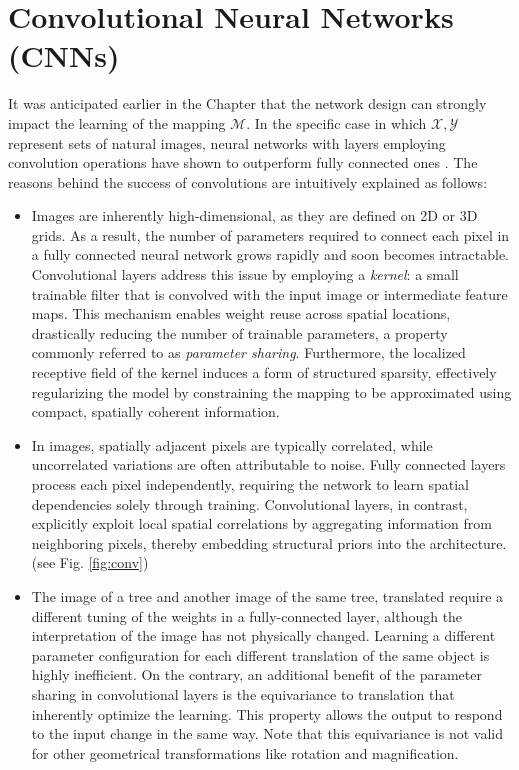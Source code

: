 \section{Convolutional Neural Networks (CNNs)}

It was anticipated earlier in the Chapter that the network design can strongly impact the learning of the mapping 
$\mathcal{M}$. In the specific case in which $\mathcal{X}, \mathcal{Y}$ represent sets of natural images, neural 
networks with layers employing convolution operations have shown to outperform fully connected ones \cite{Fukushima1982,LeCun1989Handwritten, LeCun1989Backpropagation}. 
The reasons behind the success of convolutions are intuitively explained as follows: 

\begin{itemize}

    \item Images are inherently high-dimensional, as they are defined on 2D or 3D grids. As a result, the number of 
    parameters required to connect each pixel in a fully connected neural network grows rapidly and soon becomes 
    intractable. Convolutional layers address this issue by employing a \textit{kernel}: a small trainable filter 
    that is convolved with the input image or intermediate feature maps. This mechanism enables weight reuse across spatial 
    locations, drastically reducing the number of trainable parameters, a property commonly referred to as 
    \textit{parameter sharing}. Furthermore, the localized receptive field of the kernel induces a form of structured 
    sparsity, effectively regularizing the model by constraining the mapping to be approximated using compact, spatially 
    coherent information.

    \item  In images, spatially adjacent pixels are typically correlated, while uncorrelated variations are often 
    attributable to noise. Fully connected layers process each pixel independently, requiring the network to learn 
    spatial dependencies solely through training. Convolutional layers, in contrast, explicitly exploit local spatial 
    correlations by aggregating information from neighboring pixels, thereby embedding structural priors into the 
    architecture. (see Fig. \ref{fig:conv})

    \item The image of a tree and another image of the same tree, translated require a different tuning of the
    weights in a fully-connected layer, although the interpretation of the image has not physically changed. 
    Learning a different parameter configuration for each different translation of the same object is highly inefficient. 
    On the contrary, an additional benefit of the parameter sharing in convolutional layers is the equivariance to 
    translation that inherently optimize the learning. This property allows the output to respond to the input change 
    in the same way. Note that this equivariance is not valid for other geometrical transformations like rotation and 
    magnification.

\end{itemize} 

